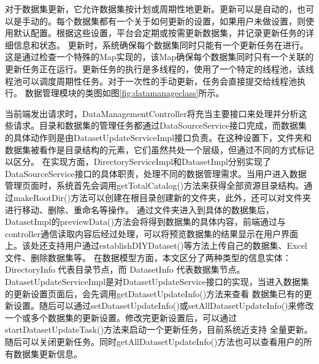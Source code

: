 对于数据集更新，它允许数据集按计划或周期性地更新。更新可以是自动的，也可以是手动的。每个数据集都有一个关于如何更新的设置，如果用户未做设置，则使用默认配置。根据这些设置，平台会定期或按需更新数据集，并记录更新任务的详细信息和状态。
更新时，系统确保每个数据集同时只能有一个更新任务在进行。这是通过检查一个特殊的Map实现的，该Map确保每个数据集同时只有一个关联的更新任务正在运行。更新任务的执行是多线程的，使用了一个特定的线程池，该线程池可以调度周期性任务。对于一次性的手动更新，任务会直接提交给线程池执行。
数据管理模块的类图如图\ref{fig:datamanageclass}所示。

当前端发出请求时，DataManagementController将充当主要接口来处理并分析这些请求。目录和数据集的管理任务都通过DataSourceService接口完成，而数据集的具体动作则是由DatasetUpdateServiceImpl接口负责。在这种设置下，文件夹和数据集被看作是目录结构的元素，它们虽然共处一个层级，但通过不同的方式标记以区分。
在实现方面，DirectoryServiceImpl和DatasetImpl分别实现了DataSourceService接口的具体职责，处理不同的数据管理需求。当用户进入数据管理页面时，系统首先会调用getTotalCatalog()方法来获得全部资源目录结构。通过makeRootDir()方法可以创建在根目录创建新的文件夹，此外，还可以对文件夹进行移动、删除、重命名等操作。
通过文件夹进入到具体的数据集后，DatasetImpl的previewData()方法会将得到数据集的具体内容，前端通过与controller通信读取内容后经过处理，可以将预览数据集的结果显示在用户界面上。该处还支持用户通过establishDIYDataset()等方法上传自己的数据集、Excel文件、删除数据集等。
在数据模型方面，本文区分了两种类型的信息实体：DirectoryInfo 代表目录节点，而 DatasetInfo 代表数据集节点。DatasetUpdateServiceImpl是对DatasetUpdateService接口的实现，当进入数据集的更新设置页面后，会先调用getDatasetUpdateInfo()方法来查看
数据集已有的更新设置。随后可以通过setDatasetUpdateInfo()或setAllDatasetUpdateInfo()来修改一个或多个数据集的更新设置。修改完更新设置后，可以通过startDatasetUpdateTask()方法来启动一个更新任务，目前系统近支持
全量更新。随后可以关闭更新任务。同时getAllDatasetUpdateInfo()方法也可以查看用户的所有数据集更新信息。
